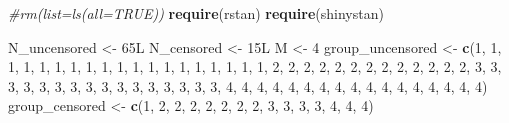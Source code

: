 \documentclass[]{article}
\newenvironment{Shaded}{\begin{snugshade}}{\end{snugshade}}
\newcommand{\KeywordTok}[1]{\textcolor[rgb]{0.13,0.29,0.53}{\textbf{#1}}}
\newcommand{\DecValTok}[1]{\textcolor[rgb]{0.00,0.00,0.81}{#1}}
\newcommand{\StringTok}[1]{\textcolor[rgb]{0.31,0.60,0.02}{#1}}
\newcommand{\CommentTok}[1]{\textcolor[rgb]{0.56,0.35,0.01}{\textit{#1}}}
\newcommand{\NormalTok}[1]{#1}
\begin{document}
\begin{Shaded}
\begin{Highlighting}[]
\CommentTok{#rm(list=ls(all=TRUE))}
\KeywordTok{require}\NormalTok{(rstan)}
\KeywordTok{require}\NormalTok{(shinystan)}

\NormalTok{N_uncensored <-}\StringTok{ }\NormalTok{65L}
\NormalTok{N_censored <-}\StringTok{ }\NormalTok{15L}
\NormalTok{M <-}\StringTok{ }\DecValTok{4}
\NormalTok{group_uncensored <-}
\KeywordTok{c}\NormalTok{(}\DecValTok{1}\NormalTok{, }\DecValTok{1}\NormalTok{, }\DecValTok{1}\NormalTok{, }\DecValTok{1}\NormalTok{, }\DecValTok{1}\NormalTok{, }\DecValTok{1}\NormalTok{, }\DecValTok{1}\NormalTok{, }\DecValTok{1}\NormalTok{, }\DecValTok{1}\NormalTok{, }\DecValTok{1}\NormalTok{, }\DecValTok{1}\NormalTok{, }\DecValTok{1}\NormalTok{, }\DecValTok{1}\NormalTok{, }\DecValTok{1}\NormalTok{, }\DecValTok{1}\NormalTok{, }\DecValTok{1}\NormalTok{, }\DecValTok{1}\NormalTok{, }\DecValTok{1}\NormalTok{, }\DecValTok{1}\NormalTok{, }\DecValTok{2}\NormalTok{, }
\DecValTok{2}\NormalTok{, }\DecValTok{2}\NormalTok{, }\DecValTok{2}\NormalTok{, }\DecValTok{2}\NormalTok{, }\DecValTok{2}\NormalTok{, }\DecValTok{2}\NormalTok{, }\DecValTok{2}\NormalTok{, }\DecValTok{2}\NormalTok{, }\DecValTok{2}\NormalTok{, }\DecValTok{2}\NormalTok{, }\DecValTok{2}\NormalTok{, }\DecValTok{2}\NormalTok{, }\DecValTok{3}\NormalTok{, }\DecValTok{3}\NormalTok{, }\DecValTok{3}\NormalTok{, }\DecValTok{3}\NormalTok{, }\DecValTok{3}\NormalTok{, }\DecValTok{3}\NormalTok{, }\DecValTok{3}\NormalTok{, }\DecValTok{3}\NormalTok{, }\DecValTok{3}\NormalTok{, }
\DecValTok{3}\NormalTok{, }\DecValTok{3}\NormalTok{, }\DecValTok{3}\NormalTok{, }\DecValTok{3}\NormalTok{, }\DecValTok{3}\NormalTok{, }\DecValTok{3}\NormalTok{, }\DecValTok{3}\NormalTok{, }\DecValTok{4}\NormalTok{, }\DecValTok{4}\NormalTok{, }\DecValTok{4}\NormalTok{, }\DecValTok{4}\NormalTok{, }\DecValTok{4}\NormalTok{, }\DecValTok{4}\NormalTok{, }\DecValTok{4}\NormalTok{, }\DecValTok{4}\NormalTok{, }\DecValTok{4}\NormalTok{, }\DecValTok{4}\NormalTok{, }\DecValTok{4}\NormalTok{, }\DecValTok{4}\NormalTok{, }\DecValTok{4}\NormalTok{, }\DecValTok{4}\NormalTok{, }
\DecValTok{4}\NormalTok{, }\DecValTok{4}\NormalTok{, }\DecValTok{4}\NormalTok{)}
\NormalTok{group_censored <-}
\KeywordTok{c}\NormalTok{(}\DecValTok{1}\NormalTok{, }\DecValTok{2}\NormalTok{, }\DecValTok{2}\NormalTok{, }\DecValTok{2}\NormalTok{, }\DecValTok{2}\NormalTok{, }\DecValTok{2}\NormalTok{, }\DecValTok{2}\NormalTok{, }\DecValTok{2}\NormalTok{, }\DecValTok{3}\NormalTok{, }\DecValTok{3}\NormalTok{, }\DecValTok{3}\NormalTok{, }\DecValTok{3}\NormalTok{, }\DecValTok{4}\NormalTok{, }\DecValTok{4}\NormalTok{, }\DecValTok{4}\NormalTok{)}

\end{Highlighting}
\end{Shaded}
\end{document}
